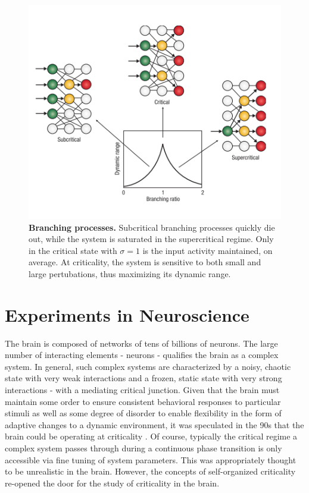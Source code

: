 \documentclass[12pt]{article}
\begin{document}
\begin{figure}      
  \begin{center}    
 \includegraphics[width=.55\textwidth]{Branchingprocesschialvo}    
    \caption{\textbf{Branching processes.} Subcritical branching processes quickly die out, while the system is saturated in the supercritical regime. Only in the critical state with $\sigma = 1$ is the input activity maintained, on average. At criticality, the system is sensitive to both small and large pertubations, thus maximizing its dynamic range. \cite{Chialvo2006a}}   
   \label{Figure::Critical Branching Process}   
  \end{center}     
   \end{figure}

\section*{Experiments in Neuroscience}

The brain is composed of networks of tens of billions of neurons. The large number of interacting elements - neurons - qualifies the brain as a complex system. In general, such complex systems are characterized by a noisy, chaotic state with very weak interactions and a frozen, static state with very strong interactions - with a mediating critical junction. Given that the brain must maintain some order to ensure consistent behavioral responses to particular stimuli as well as some degree of disorder to enable flexibility in the form of adaptive changes to a dynamic environment, it was speculated in the 90s that the brain could be operating at criticality \cite{Bak1987a}. Of course, typically the critical regime a complex system passes through during a continuous phase transition is only accessible via fine tuning of system parameters. This was appropriately  thought to be unrealistic in the brain. However, the concepts of self-organized criticality re-opened the door for the study of criticality in the brain.
\end{document}
